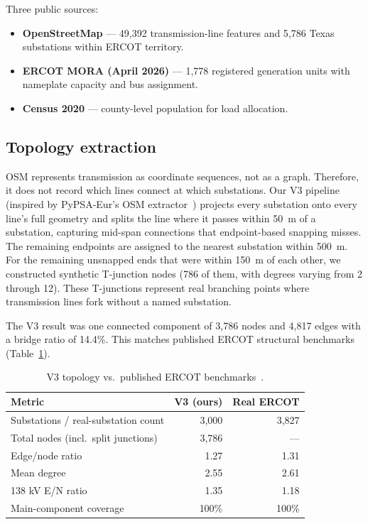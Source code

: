 \documentclass[12pt,letterpaper]{article}
\begin{document}
Three public sources:
\begin{itemize}
    \item \textbf{OpenStreetMap} --- 49{,}392 transmission-line features and 5{,}786 Texas substations within ERCOT territory.
    \item \textbf{ERCOT MORA (April 2026)} --- 1{,}778 registered generation units with nameplate capacity and bus assignment.
    \item \textbf{Census 2020} --- county-level population for load allocation.
\end{itemize}

\subsection{Topology extraction}

OSM represents transmission as coordinate sequences, not as a graph. Therefore, it does not record which lines connect at which substations. Our V3 pipeline (inspired by PyPSA-Eur's OSM extractor~\cite{xiong2025}) projects every substation onto every line's full geometry and splits the line where it passes within 50~m of a substation, capturing mid-span connections that endpoint-based snapping misses. The remaining endpoints are assigned to the nearest substation within 500~m. For the remaining unsnapped ends that were within 150~m of each other, we constructed synthetic T-junction nodes (786 of them, with degrees varying from 2 through 12). These T-junctions represent real branching points where transmission lines fork without a named substation.

The V3 result was one connected component of 3{,}786 nodes and 4{,}817 edges with a bridge ratio of 14.4\%. This matches published ERCOT structural benchmarks (Table~\ref{tab:topo_health}).

\begin{table}[h]
\centering
\caption{V3 topology vs.\ published ERCOT benchmarks~\cite{aksoy2018}.}
\label{tab:topo_health}
\begin{tabular}{@{}lrr@{}}
\toprule
\textbf{Metric} & \textbf{V3 (ours)} & \textbf{Real ERCOT} \\
\midrule
Substations / real-substation count & 3{,}000 & 3{,}827 \\
Total nodes (incl.\ split junctions) & 3{,}786 & --- \\
Edge/node ratio & 1.27 & 1.31 \\
Mean degree & 2.55 & 2.61 \\
138 kV E/N ratio & 1.35 & 1.18 \\
Main-component coverage & 100\% & 100\% \\
\bottomrule
\end{tabular}
\end{table}
\end{document}
